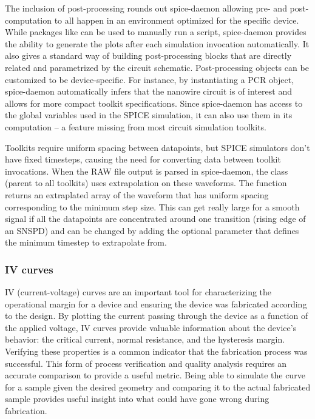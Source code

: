 The inclusion of post-processing rounds out spice-daemon allowing pre- and post-computation
to all happen in an environment optimized for the specific device. While
packages like  can be used to manually 
run a script, spice-daemon
provides the ability to generate the plots after each simulation invocation automatically.
It also gives a standard way of building post-processing blocks that are directly related
and parametrized by the circuit schematic. 
Post-processing objects can be customized to be device-specific.
For instance, by instantiating a PCR object, spice-daemon automatically infers that 
the nanowire circuit is of interest and allows for more compact toolkit specifications.
Since spice-daemon has access to the global
variables used in the SPICE simulation, it can also use them in its computation -- a feature
missing from most circuit simulation toolkits.

Toolkits require uniform spacing between datapoints, but SPICE simulators don't have fixed timesteps, 
causing the need for converting data between toolkit invocations. When the RAW file output is parsed
in spice-daemon, the  class (parent to all toolkits) uses extrapolation on these
waveforms. The function  returns an extraplated  
array of the waveform that has uniform spacing corresponding to the minimum step size. This can
get really large for a smooth signal if all the datapoints are concentrated around one transition
(rising edge of an SNSPD) and can be changed by adding the optional parameter  that defines 
the minimum timestep to extrapolate from.

\subsubsection{IV curves}

IV (current-voltage) curves are an important tool for characterizing the operational margin for a device and ensuring the device was fabricated according to the design. By plotting the current passing through the device as a function of the applied voltage, 
IV curves provide valuable information about the device's behavior: the critical current, 
normal resistance, and the hysteresis margin. Verifying these properties is a common 
indicator that the fabrication process was successful. 
This form of process verification and quality analysis requires an accurate
comparison to provide a useful metric. Being able to simulate the curve for a sample given the desired geometry and comparing
it to the actual fabricated sample provides useful insight into what could have gone wrong during fabrication. 

